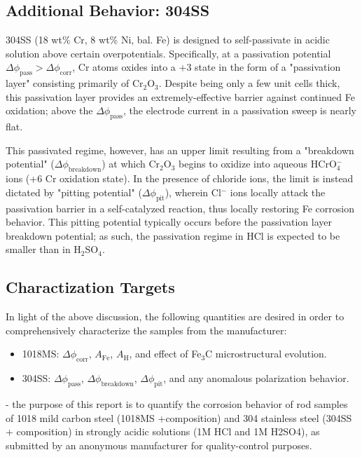 \subsection{Additional Behavior: 304SS}

304SS (18 wt\% Cr, 8 wt\% Ni, bal. Fe) is designed to self-passivate in acidic solution above certain overpotentials.  Specifically, at a passivation potential $\Delta \phi_{\text{pass}} > \Delta \phi_{\text{corr}}$, Cr atoms oxides into a +3 state in the form of a "passivation layer" consisting primarily of Cr$_2$O$_3$.  Despite being only a few unit cells thick, this passivation layer provides an extremely-effective barrier against continued Fe oxidation; above the $\Delta \phi_{\text{pass}}$, the electrode current in a passivation sweep is nearly flat.

This passivated regime, however, has an upper limit resulting from a "breakdown potential" ($\Delta \phi_{\text{breakdown}}$) at which Cr$_2$O$_3$ begins to oxidize into aqueous HCrO$_4^-$ ions (+6 Cr oxidation state).  In the presence of chloride ions, the limit is instead dictated by "pitting potential" ($\Delta \phi_{\text{pit}}$), wherein Cl$^-$ ions locally attack the passivation barrier in a self-catalyzed reaction, thus locally restoring Fe corrosion behavior.  This pitting potential typically occurs before the passivation layer breakdown potential; as such, the passivation regime in HCl is expected to be smaller than in H$_2$SO$_4$.

\subsection{Charactization Targets}

In light of the above discussion, the following quantities are desired in order to comprehensively characterize the samples from the manufacturer:

\begin{itemize}

\item 1018MS: $\Delta \phi_{\text{corr}}$, $A_{\text{Fe}}$, $A_{\text{H}}$, and effect of Fe$_3$C microstructural evolution.

\item 304SS: $\Delta \phi_{\text{pass}}$, $\Delta \phi_{\text{breakdown}}$, $\Delta \phi_{\text{pit}}$, and any anomalous polarization behavior.

\end{itemize}

\iffalse
- the purpose of this report is to quantify the corrosion behavior of rod samples of 1018 mild carbon steel (1018MS +composition) and 304 stainless steel (304SS + composition) in strongly acidic solutions (1M HCl and 1M H2SO4), as submitted by an anonymous manufacturer for quality-control purposes.

